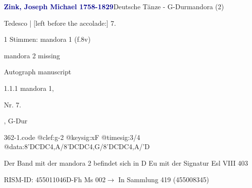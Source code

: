 \documentclass[twocolumn, 12pt]{book}
\begin{document}
\par \vspace{16pt} \textcolor{darkblue}{\textbf{Zink, Joseph Michael  1758-1829}}\hfillplus{\textbf{[362]}}\newline Deutsche Tänze - G-Dur\newline mandora (2)
\par \begin{itshape}[f.8v, at left:] Tedesco | [left before the accolade:] 7.\end{itshape} 
\par \textcolor{darkblue}{}  1 Stimmen: mandora 1  (f.8v)\newline \begin{small} mandora 2 missing\end{small} \newline Autograph manuscript
\par 1.1.1  mandora 1, \begin{itshape}Nr. 7.\end{itshape}, G-Dur  
\begin{filecontents*}{362-1.code}
@clef:g-2
@keysig:xF
@timesig:3/4
@data:8'DCDC4,A/8'DCDC4,G/8'DCDC4,A/'D
\end{filecontents*}
\newline %
\par Der Band mit der mandora 2 befindet sich in D Eu mit der Signatur Esl VIII 403
\par RISM-ID: 455011046\newline D-Fh  Ms 002\newline $\rightarrow$ In Sammlung 419 (455008345)
      
\end{document}
